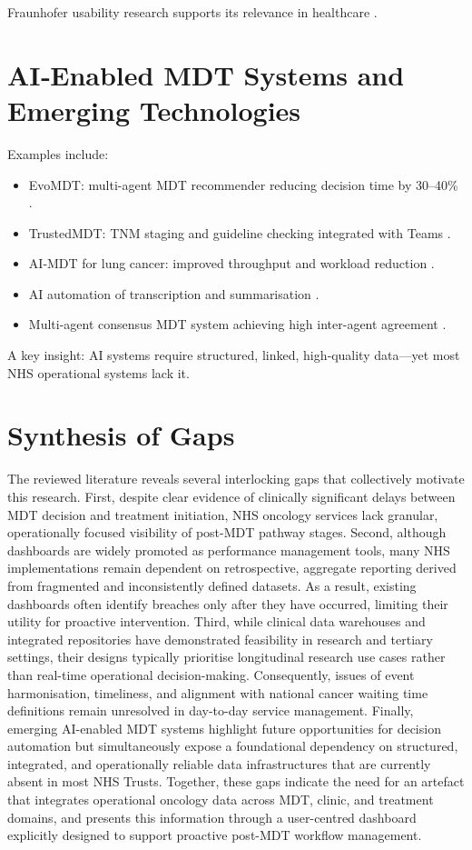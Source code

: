 Fraunhofer usability research supports its relevance in healthcare \citep{hunkirchen}.

\section{AI‑Enabled MDT Systems and Emerging Technologies}

Examples include:

\begin{itemize}
    \item EvoMDT: multi-agent MDT recommender reducing decision time by 30–40\% \citep{liu2026}.
    \item TrustedMDT: TNM staging and guideline checking integrated with Teams \citep{soltan2025}.
    \item AI‑MDT for lung cancer: improved throughput and workload reduction \citep{liu2026a}.
    \item AI automation of transcription and summarisation \citep{healthorbit2025}.
    \item Multi-agent consensus MDT system achieving high inter-agent agreement \citep{han2025}.
\end{itemize}

A key insight: AI systems require structured, linked, high‑quality data—yet most NHS operational systems lack it.

\section{Synthesis of Gaps}

The reviewed literature reveals several interlocking gaps that collectively motivate this research. First, despite clear evidence of clinically significant delays between MDT decision and treatment initiation, NHS oncology services lack granular, operationally focused visibility of post-MDT pathway stages. Second, although dashboards are widely promoted as performance management tools, many NHS implementations remain dependent on retrospective, aggregate reporting derived from fragmented and inconsistently defined datasets. As a result, existing dashboards often identify breaches only after they have occurred, limiting their utility for proactive intervention.
Third, while clinical data warehouses and integrated repositories have demonstrated feasibility in research and tertiary settings, their designs typically prioritise longitudinal research use cases rather than real-time operational decision-making. Consequently, issues of event harmonisation, timeliness, and alignment with national cancer waiting time definitions remain unresolved in day-to-day service management. Finally, emerging AI-enabled MDT systems highlight future opportunities for decision automation but simultaneously expose a foundational dependency on structured, integrated, and operationally reliable data infrastructures that are currently absent in most NHS Trusts.
Together, these gaps indicate the need for an artefact that integrates operational oncology data across MDT, clinic, and treatment domains, and presents this information through a user-centred dashboard explicitly designed to support proactive post-MDT workflow management.

